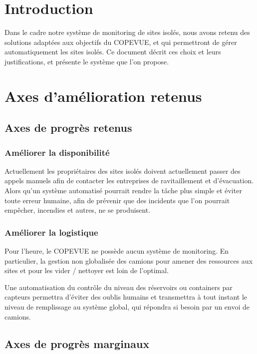 \section{Introduction}

Dans le cadre notre système de monitoring de sites isolés, nous avons retenu des solutions adaptées aux objectifs du COPEVUE, et qui permettront de gérer automatiquement les sites isolés. Ce document décrit ces choix et leurs justifications, et présente le système que l’on propose.

\section{Axes d’amélioration retenus}

\subsection{Axes de progrès retenus}

\subsubsection{Améliorer la disponibilité}
Actuellement les propriétaires des sites isolés doivent actuellement passer des appels manuels afin de contacter les entreprises de ravitaillement et d’évacuation. Alors qu’un système automatisé pourrait rendre la tâche plus simple et éviter toute erreur humaine, afin de prévenir que des incidents que l’on pourrait empêcher, incendies et autres, ne se produisent.

\subsubsection{Améliorer la logistique}
Pour l’heure, le COPEVUE ne possède aucun système de monitoring. En particulier, la gestion non globalisée des camions pour amener des ressources aux sites et pour les vider /  nettoyer est loin de l’optimal.


Une automatisation du contrôle du niveau des réservoirs ou containers par capteurs permettra d’éviter des oublis humains et transmettra à tout instant le niveau de remplissage au système global, qui répondra si besoin par un envoi de camions.

\subsection{Axes de progrès marginaux}

